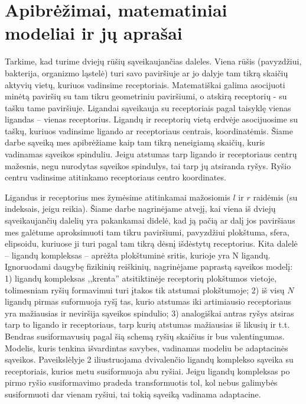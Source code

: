 \documentclass[10pt]{article}
\begin{document}
\section{Apibrėžimai, matematiniai modeliai ir jų aprašai}

Tarkime, kad turime dviejų rūšių sąveikaujančias daleles. Viena rūšis (pavyzdžiui, bakterija, organizmo ląstelė) turi savo paviršiuje ar jo dalyje tam tikrą skaičių aktyvių vietų, kuriuos  vadinsime receptoriais. Matematiškai galima asocijuoti minėtą paviršių su tam tikru geometriniu paviršiumi, o atskirą receptorių -  su tašku tame paviršiuje. Ligandai  sąveikauja su receptoriais pagal taisyklę vienas ligandas – vienas receptorius.  Ligandų ir receptorių vietą erdvėje asocijuosime su taškų, kuriuos vadinsime ligando ar receptoriaus centrais, koordinatėmis. Šiame darbe sąveiką mes apibrėžiame kaip tam tikrą neneigiamą skaičių, kuris vadinamas sąveikos spinduliu. Jeigu atstumas tarp ligando ir receptoriaus centrų mažesnis, negu nurodytas sąveikos spindulys, tai tarp jų atsiranda ryšys. Ryšio centru vadinsime atitinkamo receptoriaus centro koordinates.

Ligandus ir receptorius mes žymėsime atitinkamai  mažosiomis  $l$ ir $r$ raidėmis (su indeksais, jeigu reikia). Šiame darbe  nagrinėjame atvejį, kai viena iš dviejų sąveikaujančių dalelių yra pakankamai didelė, kad  ją pačią  ar  dalį jos paviršiaus mes galėtume aproksimuoti tam tikru paviršiumi, pavyzdžiui  plokštuma, sfera, elipsoidu, kuriuose ji turi  pagal tam tikrą dėsnį išdėstytų  receptorius. Kita dalelė – ligandų kompleksas –  aprėžta plokštuminė sritis, kurioje yra N  ligandų. Ignoruodami daugybę fizikinių  reiškinių, nagrinėjame paprastą  sąveikos  modelį: 
       1)   ligandų kompleksas ,,krenta'' atsitiktinėje receptorių plokštumos vietoje, tolimesniam ryšių formavimui turi įtakos tik atstumai plokštumoje;
        	2)    iš visų $N$ ligandų pirmas suformuoja ryšį tas, kurio atstumas iki artimiausio receptoriaus yra  mažiausias ir neviršija sąveikos spindulio;
            	3)  analogiškai antras ryšys atsiras tarp to ligando ir receptoriaus, tarp kurių atstumas mažiausias iš likusių ir t.t.  
          Bendras susiformavusių pagal šią schemą ryšių skaičius  ir bus valentingumas. Modelis, kuris tenkina išvardintas savybes, vadinamas modeliu  be adaptacinės sąveikos. Paveikslėlyje 2 iliustruojama dvivalenčio ligandų komplekso sąveika su receptoriais, kurios metu susiformuoja  abu ryšiai. Jeigu ligandų kompleksas po pirmo ryšio susiformavimo pradeda transformuotis tol, kol nebus galimybės susiformuoti dar vienam ryšiui, tai tokią sąveiką vadinama  adaptacine.  
          
\end{document}
